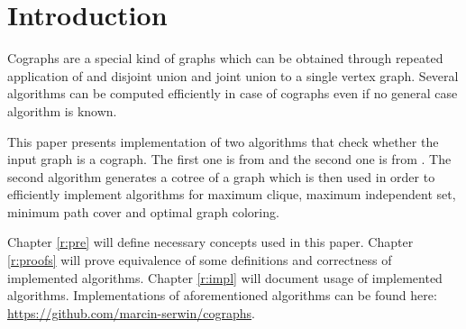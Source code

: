 
\chapter*{Introduction}

Cographs are a special kind of graphs which can be obtained through repeated application of and disjoint union and joint union to a single vertex graph. Several algorithms can be computed efficiently in case of cographs even if no general case algorithm is known.

This paper presents implementation of two algorithms that check whether the input graph is a cograph. The first one is from \cite{habib} and the second one is from \cite{corneil}. The second algorithm generates a cotree of a graph which is then used in order to efficiently implement algorithms for maximum clique, maximum independent set, minimum path cover and optimal graph coloring.

Chapter \ref{r:pre} will define necessary concepts used in this paper. Chapter \ref{r:proofs} will prove equivalence of some definitions and correctness of implemented algorithms. Chapter \ref{r:impl} will document usage of implemented algorithms. Implementations of aforementioned algorithms can be found here: \url{https://github.com/marcin-serwin/cographs}.

